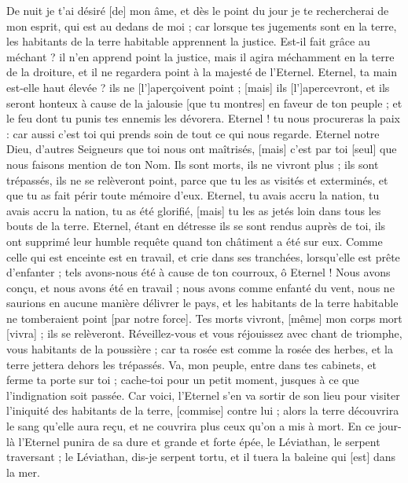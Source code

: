 \begin{multicols}{2}
De nuit je t'ai désiré [de] mon âme, et dès le point du jour je te rechercherai de mon esprit, qui est au dedans de moi ; car lorsque tes jugements sont en la terre, les habitants de la terre habitable apprennent la justice.
Est-il fait grâce au méchant ? il n'en apprend point la justice, mais il agira méchamment en la terre de la droiture, et il ne regardera point à la majesté de l'Eternel.
Eternel, ta main est-elle haut élevée ? ils ne [l']aperçoivent point ; [mais] ils [l']apercevront, et ils seront honteux à cause de la jalousie [que tu montres] en faveur de ton peuple ; et le feu dont tu punis tes ennemis les dévorera.
Eternel ! tu nous procureras la paix : car aussi c'est toi qui prends soin de tout ce qui nous regarde.
Eternel notre Dieu, d'autres Seigneurs que toi nous ont maîtrisés, [mais] c'est par toi [seul] que nous faisons mention de ton Nom.
Ils sont morts, ils ne vivront plus ; ils sont trépassés, ils ne se relèveront point, parce que tu les as visités et exterminés, et que tu as fait périr toute mémoire d'eux.
Eternel, tu avais accru la nation, tu avais accru la nation, tu as été glorifié, [mais] tu les as jetés loin dans tous les bouts de la terre.
Eternel, étant en détresse ils se sont rendus auprès de toi, ils ont supprimé leur humble requête quand ton châtiment a été sur eux.
Comme celle qui est enceinte est en travail, et crie dans ses tranchées, lorsqu'elle est prête d'enfanter ; tels avons-nous été à cause de ton courroux, ô Eternel !
Nous avons conçu, et nous avons été en travail ; nous avons comme enfanté du vent, nous ne saurions en aucune manière délivrer le pays, et les habitants de la terre habitable ne tomberaient point [par notre force].
Tes morts vivront, [même] mon corps mort [vivra] ; ils se relèveront. Réveillez-vous et vous réjouissez avec chant de triomphe, vous habitants de la poussière ; car ta rosée est comme la rosée des herbes, et la terre jettera dehors les trépassés.
Va, mon peuple, entre dans tes cabinets, et ferme ta porte sur toi ; cache-toi pour un petit moment, jusques à ce que l'indignation soit passée.
Car voici, l'Eternel s'en va sortir de son lieu pour visiter l'iniquité des habitants de la terre, [commise] contre lui ; alors la terre découvrira le sang qu'elle aura reçu, et ne couvrira plus ceux qu'on a mis à mort.
\VerseOne{}En ce jour-là l'Eternel punira de sa dure et grande et forte épée, le Léviathan, le serpent traversant ; le Léviathan, dis-je serpent tortu, et il tuera la baleine qui [est] dans la mer.

\end{multicols}
